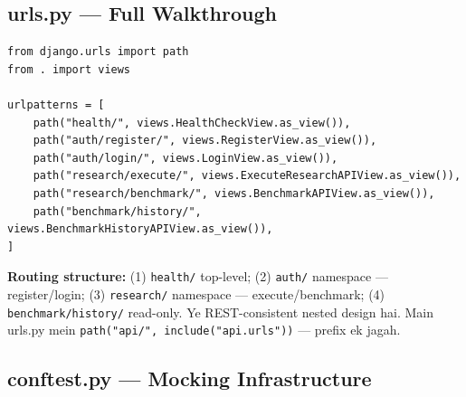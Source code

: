 \subsection{urls.py --- Full Walkthrough}

\begin{codestorybox}
\begin{lstlisting}[style=pythonstyle, caption={api/urls.py}]
from django.urls import path
from . import views

urlpatterns = [
    path("health/", views.HealthCheckView.as_view()),
    path("auth/register/", views.RegisterView.as_view()),
    path("auth/login/", views.LoginView.as_view()),
    path("research/execute/", views.ExecuteResearchAPIView.as_view()),
    path("research/benchmark/", views.BenchmarkAPIView.as_view()),
    path("benchmark/history/", views.BenchmarkHistoryAPIView.as_view()),
]
\end{lstlisting}

\textbf{Routing structure:} (1) \texttt{health/} top-level; (2) \texttt{auth/} namespace --- register/login; (3) \texttt{research/} namespace --- execute/benchmark; (4) \texttt{benchmark/history/} read-only. Ye REST-consistent nested design hai. Main urls.py mein \texttt{path("api/", include("api.urls"))} --- prefix ek jagah.
\end{codestorybox}

\subsection{conftest.py --- Mocking Infrastructure}

